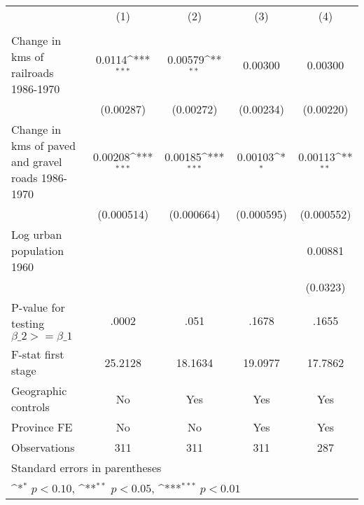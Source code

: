 {
\def\sym#1{\ifmmode^{#1}\else\(^{#1}\)\fi}
\begin{tabular}{l*{4}{c}}
\hline\hline
                &\multicolumn{1}{c}{(1)}&\multicolumn{1}{c}{(2)}&\multicolumn{1}{c}{(3)}&\multicolumn{1}{c}{(4)}\\
                &\multicolumn{1}{c}{}&\multicolumn{1}{c}{}&\multicolumn{1}{c}{}&\multicolumn{1}{c}{}\\
\hline
Change in kms of railroads 1986-1970&   0.0114\sym{***}&  0.00579\sym{**} &  0.00300         &  0.00300         \\
                &(0.00287)         &(0.00272)         &(0.00234)         &(0.00220)         \\
[1em]
Change in kms of paved and gravel roads 1986-1970&  0.00208\sym{***}&  0.00185\sym{***}&  0.00103\sym{*}  &  0.00113\sym{**} \\
                &(0.000514)         &(0.000664)         &(0.000595)         &(0.000552)         \\
[1em]
Log urban population 1960&                  &                  &                  &  0.00881         \\
                &                  &                  &                  & (0.0323)         \\
\hline
P-value for testing $\beta\_{2} >= \beta\_{1}$&    .0002         &     .051         &    .1678         &    .1655         \\
F-stat first stage&  25.2128         &  18.1634         &  19.0977         &  17.7862         \\
Geographic controls&       No         &      Yes         &      Yes         &      Yes         \\
Province FE     &       No         &       No         &      Yes         &      Yes         \\
Observations    &      311         &      311         &      311         &      287         \\
\hline\hline
\multicolumn{5}{l}{\footnotesize Standard errors in parentheses}\\
\multicolumn{5}{l}{\footnotesize \sym{*} \(p<0.10\), \sym{**} \(p<0.05\), \sym{***} \(p<0.01\)}\\
\end{tabular}
}
